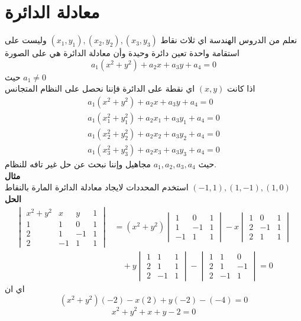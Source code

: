 \section{معادلة الدائرة}
نعلم من الدروس الهندسة اي ثلاث نقاط
$(x_1, y_1), (x_2, y_2), (x_3, y_3)$
وليست على استقامة واحدة تعين دائرة وحيدة وأن معادلة الدائرة هي على الصورة
\[
a_1(x^2 + y^2) + a_2 x + a_3 y + a_4 =0 
\]
حيث $a_1\neq0$\\
اذا كانت $(x,y)$ اي نقطة على الدائرة فإننا نحصل على النظام المتجانس
\begin{align*}
	a_1(x^2 + y^2) + a_2 x + a_3 y + a_4 =0 \\
	a_1(x_1^2 + y_1^2) + a_2 x_1 + a_3 y_1 + a_4 =0 \\
	a_1(x_2^2 + y_2^2) + a_2 x_2 + a_3 y_2 + a_4 =0\\ 
	a_1(x_3^2 + y_3^2) + a_2 x_3 + a_3 y_3 + a_4 =0 
\end{align*}
حيث $a_1,a_2,a_3,a_4$ مجاهيل وإننا نبحث عن حل غير تافه للنظام.\\
\noindent
\textbf{مثال}\\
\noindent
استخدم المحددات لايجاد معادلة الدائرة المارة بالنقاط
$(-1, 1), (1,-1), (1,0)$\\
\noindent
\textbf{الحل}
\begin{align*}
	\begin{vmatrix}
		x^2+y^2 & x & y & 1\\
		1 & 1 & 0 & 1\\
		2 & 1 & -1 & 1 \\
		2 & -1 & 1 & 1
	\end{vmatrix} & = (x^2 +y^2)
	\begin{vmatrix}
		1&0&1\\
		1&-1&1\\
		-1&1&1
	\end{vmatrix}
	-x
	\begin{vmatrix}
		1&0&1\\
		2&-1&1\\
		2&1&1
	\end{vmatrix}\\
	& \quad +y
	\begin{vmatrix}
		1&1&1\\
		2&1&1\\
		2&-1&1
	\end{vmatrix}
	-
	\begin{vmatrix}
		1&1&0\\
		2&1&-1\\
		2&-1&1
	\end{vmatrix} =0
\end{align*}
اي ان 
\[
(x^2 + y^2)(-2) -x(2) + y(-2) - (-4) =0 
\]
\[
x^2 + y^2 + x + y-2=0
\]

